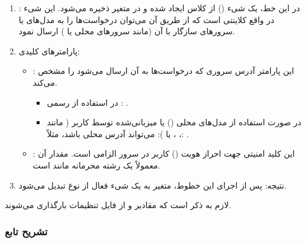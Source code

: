 \documentclass{article}
\begin{document}
\begin{enumerate}
    \item {}: در این خط، یک شیء () از کلاس  ایجاد شده و در متغیر  ذخیره می‌شود. این شیء در واقع کلاینتی است که از طریق آن می‌توان درخواست‌ها را به مدل‌های  یا سرورهای سازگار با  آن (مانند سرورهای محلی یا ) ارسال نمود.
    \item پارامترهای کلیدی:
    \begin{itemize}
        \item {}: این پارامتر آدرس  سروری که درخواست‌ها به آن ارسال می‌شود را مشخص می‌کند.
        \begin{itemize}
            \item در استفاده از  رسمی : .
            \item در صورت استفاده از مدل‌های محلی () یا میزبانی‌شده توسط کاربر ( مانند ، ، یا ):  می‌تواند آدرس  محلی باشد، مثلاً: .
        \end{itemize}
        \item {}: این کلید امنیتی جهت احراز هویت () کاربر در سرور الزامی است. مقدار آن معمولاً یک رشته محرمانه مانند  است.
    \end{itemize}
    \item نتیجه: پس از اجرای این خطوط، متغیر  به یک شیء فعال از نوع  تبدیل می‌شود.
\end{enumerate}

لازم به ذکر است که مقادیر  و  از فایل تنظیمات  بارگذاری می‌شوند.

\subsubsection{تشریح تابع }
\end{document}

